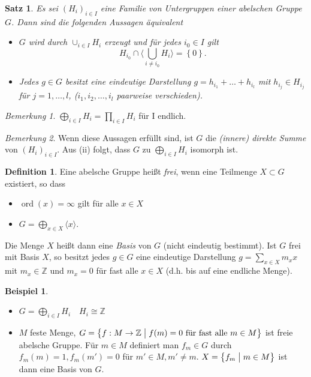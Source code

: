 \documentclass[12pt]{scrartcl} %
\newcommand{\divides}{\mathrel{\bigm|}}
\newtheorem{thm}{Satz}
\theoremstyle{definition}
\newtheorem*{defn}{Definition}
\newtheorem{ex}{Beispiel}
\theoremstyle{remark}
\newtheorem*{nb}{Bemerkung}
\begin{document}
\begin{thm}
  Es sei $(H_i)_{i \in I}$ eine Familie von Untergruppen einer abelschen Gruppe $G$. Dann sind die folgenden Aussagen äquivalent
\begin{itemize}
  \item[(i)]  $G$ wird durch $\cup_{i \in I} H_i$ erzeugt und für jedes $i_0 \in I$ gilt 
    \[ H_{i_0} \cap \langle \bigcup_{i \neq i_0} H_i \rangle = \left\{ 0 \right\}. \]
  \item Jedes $g \in G$ besitzt eine eindeutige Darstellung $g = h_{i_1} + \dots + h_{i_l}$ mit $h_{i_j} \in H_{i_j}$ für $j = 1,\dots,l$, ($i_1,i_2,\dots,i_l$ paarweise verschieden).
\end{itemize}
\end{thm}

\begin{nb}
  $ \bigoplus_{i \in I} H_i = \prod_{i \in I} H_i $ für I endlich.
\end{nb}

\begin{nb}
  Wenn diese Aussagen erfüllt sind, ist $G$ die \emph{(innere) direkte Summe} von $(H_i)_{i \in I}$. Aus (ii) folgt, dass $G$ zu $\bigoplus_{i \in I} H_i$ isomorph ist. 
\end{nb}

\begin{defn}
  Eine abelsche Gruppe heißt \emph{frei}, wenn eine Teilmenge $X \subset G$ existiert, so dass
  \begin{itemize}
    \item[(i)] $\operatorname{ord}(x) = \infty$ gilt für alle $x \in X$
    \item[(ii)] $G = \bigoplus_{x \in X} \langle x \rangle$.
  \end{itemize}

  Die Menge $X$ heißt dann eine \emph{Basis} von $G$ (nicht eindeutig bestimmt). Ist $G$ frei mit Basis $X$, so besitzt jedes $g \in G$ eine eindeutige Darstellung $g = \sum_{x \in X} m_x x$ mit $m_x \in \mathbb{Z}$ und $m_x = 0$ für fast alle $x \in X$ (d.h. bis auf eine endliche Menge).
\end{defn}

\begin{ex}
  \begin{itemize}
    \item $G = \bigoplus_{i \in I} H_i \quad H_i \cong \mathbb{Z}$
    \item $M$ feste Menge, $G = \left\{ f : M \to \mathbb{Z} \divides f(m) = 0 \text{ für fast alle } m \in M \right\}$ ist freie abelsche Gruppe.  Für $m \in M$ definiert man $f_m \in G$ durch $f_m(m) = 1, f_m(m') = 0$ für $m' \in M, m' \neq m$. $X = \left\{ f_m \divides m \in M \right\}$ ist dann eine Basis von $G$.
  \end{itemize}
\end{ex}
\end{document}
